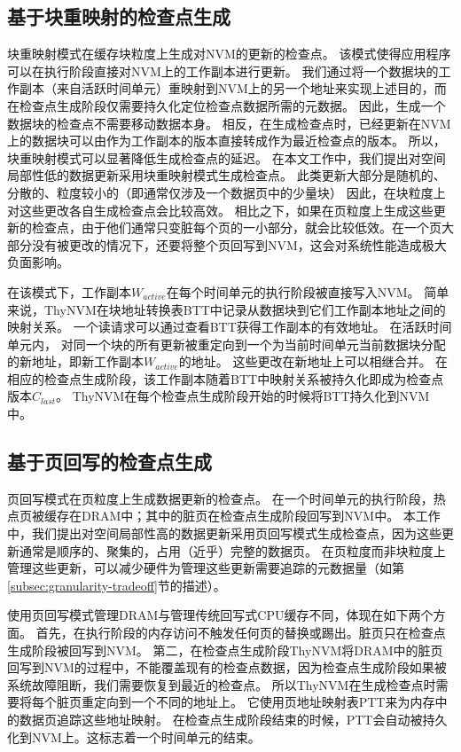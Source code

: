 \subsection{基于块重映射的检查点生成}
\label{subsec:block-remap}

块重映射模式在缓存块粒度上生成对NVM的更新的检查点。
该模式使得应用程序可以在执行阶段直接对NVM上的工作副本进行更新。
我们通过将一个数据块的工作副本（来自活跃时间单元）重映射到NVM上的另一个地址来实现上述目的，而在检查点生成阶段仅需要持久化定位检查点数据所需的元数据。
因此，生成一个数据块的检查点不需要移动数据本身。
相反，在生成检查点时，已经更新在NVM上的数据块可以由作为工作副本的版本直接转成作为最近检查点的版本。
所以，块重映射模式可以显著降低生成检查点的延迟。
在本文工作中，我们提出对空间局部性低的数据更新采用块重映射模式生成检查点。
此类更新大部分是随机的、分散的、粒度较小的（即通常仅涉及一个数据页中的少量块）
因此，在块粒度上对这些更改各自生成检查点会比较高效。
相比之下，如果在页粒度上生成这些更新的检查点，由于他们通常只变脏每个页的一小部分，就会比较低效。在一个页大部分没有被更改的情况下，还要将整个页回写到NVM，这会对系统性能造成极大负面影响。

在该模式下，工作副本$W_{active}$在每个时间单元的执行阶段被直接写入NVM。
简单来说，ThyNVM在块地址转换表BTT中记录从数据块到它们工作副本地址之间的映射关系。
一个读请求可以通过查看BTT获得工作副本的有效地址。
在活跃时间单元内， 对同一个块的所有更新被重定向到一个为当前时间单元当前数据块分配的新地址，即新工作副本$W_{active}$的地址。
这些更改在新地址上可以相继合并。
在相应的检查点生成阶段，该工作副本随着BTT中映射关系被持久化即成为检查点版本$C_{last}$。
ThyNVM在每个检查点生成阶段开始的时候将BTT持久化到NVM中。

\subsection{基于页回写的检查点生成}
\label{subsec:page-writeback}

页回写模式在页粒度上生成数据更新的检查点。
在一个时间单元的执行阶段，热点页被缓存在DRAM中；其中的脏页在检查点生成阶段回写到NVM中。
本工作中，我们提出对空间局部性高的数据更新采用页回写模式生成检查点，因为这些更新通常是顺序的、聚集的，占用（近乎）完整的数据页。
在页粒度而非块粒度上管理这些更新，可以减少硬件为管理这些更新需要追踪的元数据量（如第\ref{subsec:granularity-tradeoff}节的描述）。

使用页回写模式管理DRAM与管理传统回写式CPU缓存不同，体现在如下两个方面。
首先，在执行阶段的内存访问不触发任何页的替换或踢出。脏页只在检查点生成阶段被回写到NVM。
第二，在检查点生成阶段ThyNVM将DRAM中的脏页回写到NVM的过程中，不能覆盖现有的检查点数据，因为检查点生成阶段如果被系统故障阻断，我们需要恢复到最近的检查点。
所以ThyNVM在生成检查点时需要将每个脏页重定向到一个不同的地址上。
它使用页地址映射表PTT来为内存中的数据页追踪这些地址映射。 
在检查点生成阶段结束的时候，PTT会自动被持久化到NVM上。这标志着一个时间单元的结束。

